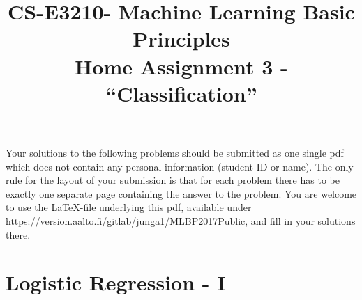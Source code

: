 \documentclass[article,11pt]{article}
\title{CS-E3210- Machine Learning Basic Principles \\ Home Assignment 3 - ``Classification''}
\begin{document}
\date{}
\maketitle

Your solutions to the following problems should be submitted as one single pdf which does not contain 
any personal information (student ID or name).  The only rule for the layout of your submission is that for each 
problem there has to be exactly one separate page containing the answer to the problem. You are welcome to use the \LaTeX-file underlying this pdf, 
available under \url{https://version.aalto.fi/gitlab/junga1/MLBP2017Public}, and fill in your solutions there. 

\newpage

\section{Logistic Regression - I}
\end{document}
